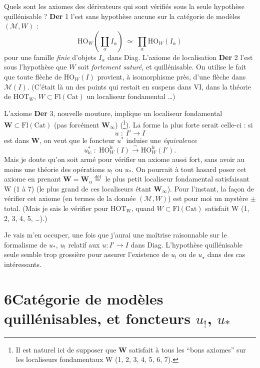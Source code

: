 \documentclass[11pt]{article}
\newcommand{\printedpage}[1]{\marginpar{\footnotesize p.~#1}}
\newcommand{\msp}[1]{\marginpar{\footnotesize [#1]}}
\begin{document}
Quels sont les axiomes des dérivateurs qui sont vérifiés sous la seule hypothèse quillénisable ? \textbf{Der} 1 l'est sans hypothèse aucune sur la catégorie de modèles $(\mathcal{M},W)$ :
\[ \mathrm{HO}_{W}(\coprod_{\alpha} I_{\alpha}) \;\simeq\; \prod_{\alpha} \mathrm{HO}_{W}(I_{\alpha}) \]
pour une famille \textit{finie} d'objets $I_{\alpha}$ dans Diag. L'axiome de localisation \textbf{Der} 2 l'est sous l'hypothèse que $W$ soit \textit{fortement saturé,} et quillénisable. On utilise le fait que toute flèche de $\mathrm{HO}_{W}(I)$ provient, à isomorphisme près, d'une flèche dans $\mathcal{M}(I)$. (C'était là un des points qui restait en suspens dans VI, dans la théorie de $\mathrm{HOT}_{W}$, $W \subset \mathrm{Fl}(\mathrm{Cat})$ un localiseur fondamental \dots)

L'axiome \textbf{Der} 3, nouvelle mouture, implique un localiseur fondamental $\mathbf{W} \subset \mathrm{Fl}(\mathrm{Cat})$ (pas forcément $\mathbf{W}_{\infty}$) (\footnote[33]{Il est naturel ici de supposer que $\mathbf{W}$ satisfait à tous les ``bons axiomes'' sur les localiseurs fondamentaux W (1, 2, 3, 4, 5, 6, 7).}). La forme la plus forte serait celle-ci : si
\[ u \;:\; I' \longrightarrow I \]
\msp{page 56}est dans $\mathbf{W}$, on veut que le foncteur $u^{*}$ induise une \textit{équivalence}
\[ u_{\mathrm{lc}}^{*} \;:\; \mathrm{HO}_{W}^{\mathrm{lc}}(I) \xrightarrow{\;\sim\;} \mathrm{HO}_{W}^{\mathrm{lc}}(I'). \]
Mais je doute qu'on soit armé pour vérifier un axiome aussi fort, sans avoir au moins une théorie des opérations $u_{!}$ ou $u_{*}$. On pourrait à tout hasard poser cet axiome en prenant $\mathbf{W} = \mathbf{W}_{\alpha} \overset{\text{déf}}{=}$ le plus petit localiseur fondamental satisfaisant W (1 à 7) (le plus grand de
\printedpage{32}
ces localiseurs étant $\mathbf{W}_{\infty}$). Pour l'instant, la façon de vérifier cet axiome (en termes de la donnée $(\mathcal{M},W)$) est pour moi un mystère $\pm$ total. (Mais je sais le vérifier pour $\mathrm{HOT}_{W}$, quand $W \subset \mathrm{Fl}(\mathrm{Cat})$ satisfait W (1, 2, 3, 4, 5, \dots).)

Je vais m'en occuper, une fois que j'aurai une maîtrise raisonnable sur le formalisme de $u_{*}$, $u_{!}$ relatif aux $u : I' \longrightarrow I$ dans Diag. L'hypothèse quillénisable seule semble trop grossière pour assurer l'existence de $u_{!}$ ou de $u_{\star}$ dans des cas intéressants. %

\noindent\msp{page 57}

\section*{6\quad Catégorie de modèles quillénisables, et foncteurs $u_{!}$, $u_{*}$}
\end{document}
